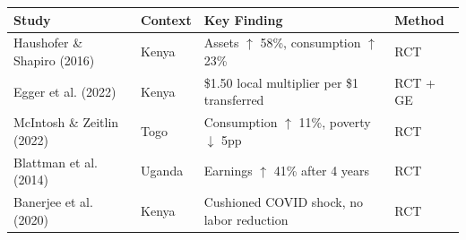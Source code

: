 
\begin{table}[h]
\centering
\small
\begin{tabular}{@{}llll@{}}
\toprule
\textbf{Study} & \textbf{Context} & \textbf{Key Finding} & \textbf{Method} \\
\midrule
Haushofer \& Shapiro (2016) & Kenya & Assets $\uparrow$ 58\%, consumption $\uparrow$ 23\% & RCT \\
Egger et al. (2022) & Kenya & \$1.50 local multiplier per \$1 transferred & RCT + GE \\
McIntosh \& Zeitlin (2022) & Togo & Consumption $\uparrow$ 11\%, poverty $\downarrow$ 5pp & RCT \\
Blattman et al. (2014) & Uganda & Earnings $\uparrow$ 41\% after 4 years & RCT \\
Banerjee et al. (2020) & Kenya & Cushioned COVID shock, no labor reduction & RCT \\
\bottomrule
\end{tabular}
\end{table}
